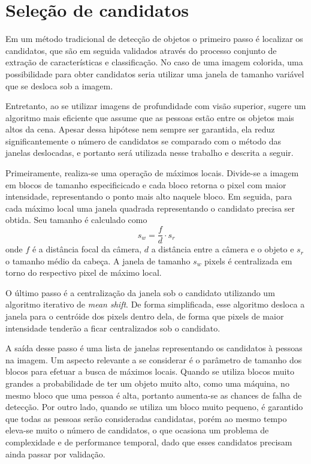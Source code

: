 \section{Seleção de candidatos}
\label{sec:candidates}

    Em um método tradicional de detecção de objetos \cite{traditional-objdetect} o primeiro passo é localizar os candidatos, que são em seguida validados através do processo conjunto de extração de características e classificação. No caso de uma imagem colorida, uma possibilidade para obter candidatos seria utilizar uma janela de tamanho variável que se desloca sob a imagem.

    Entretanto, ao se utilizar imagens de profundidade com visão superior, \cite{rauter} sugere um algoritmo mais eficiente que assume que as pessoas estão entre os objetos mais altos da cena. Apesar dessa hipótese nem sempre ser garantida, ela reduz significantemente o número de candidatos se comparado com o método das janelas deslocadas, e portanto será utilizada nesse trabalho e descrita a seguir.

    Primeiramente, realiza-se uma operação de máximos locais. Divide-se a imagem em blocos de tamanho especificicado e cada bloco retorna o pixel com maior intensidade, representando o ponto mais alto naquele bloco. Em seguida, para cada máximo local uma janela quadrada representando o candidato precisa ser obtida. Seu tamanho é calculado como
    \begin{equation}
      s_w = \frac{f}{d} \cdot s_r
    \end{equation}
    onde $f$ é a distância focal da câmera, $d$ a distância entre a câmera e o objeto e $s_r$ o tamanho médio da cabeça. A janela de tamanho $s_w$ pixels é centralizada em torno do respectivo pixel de máximo local.

    O último passo é a centralização da janela sob o candidato utilizando um algoritmo iterativo de \textit{mean shift}. De forma simplificada, esse algoritmo desloca a janela para o centróide dos pixels dentro dela, de forma que pixels de maior intensidade tenderão a ficar centralizados sob o candidato.

    A saída desse passo é uma lista de janelas representando os candidatos à pessoas na imagem. Um aspecto relevante a se considerar é o parâmetro de tamanho dos blocos para efetuar a busca de máximos locais. Quando se utiliza blocos muito grandes a probabilidade de ter um objeto muito alto, como uma máquina, no mesmo bloco que uma pessoa é alta, portanto aumenta-se as chances de falha de detecção. Por outro lado, quando se utiliza um bloco muito pequeno, é garantido que todas as pessoas serão consideradas candidatas, porém ao mesmo tempo eleva-se muito o número de candidatos, o que ocasiona um problema de complexidade e de performance temporal, dado que esses candidatos precisam ainda passar por validação.

